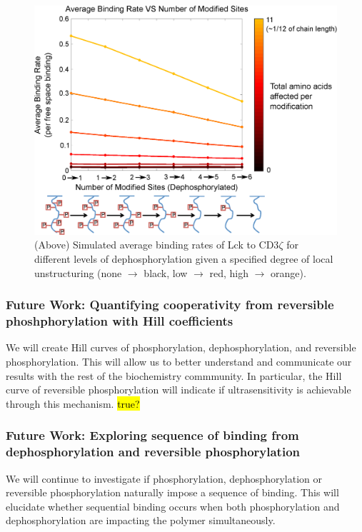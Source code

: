 \documentclass[../../AdvancementSummary.tex]{subfiles}
\begin{document}
\begin{figure}[H]
	\begin{center}
		\includegraphics[width=0.8\linewidth]{ResultsFigures/CD3ZetaStiffeningMembraneOn/Dephosphorylation/AvgBindVSTotalModified5.eps}
		\caption{(Above) Simulated average binding rates of Lck to CD3$\zeta$ for different levels of dephosphorylation given a specified degree of local unstructuring (none $\rightarrow$ black, low $\rightarrow$ red, high $\rightarrow$ orange).\label{fig: DephosMemOnCoop}}
	\end{center}
\end{figure}




\subsubsection{Future Work: Quantifying cooperativity from reversible phoshphorylation with Hill coefficients}

We will create Hill curves of phosphorylation, dephosphorylation, and reversible phosphorylation.  This will allow us to better understand and communicate our results with the rest of the biochemistry commmunity. In particular, the Hill curve of reversible phosphorylation will indicate if ultrasensitivity is achievable through this mechanism. \hl{true?}

\subsubsection{Future Work: Exploring sequence of binding from dephosphorylation and reversible phosphorylation}

We will continue to investigate if phosphorylation, dephosphorylation or reversible phosphorylation naturally impose a sequence of binding. This will elucidate whether sequential binding occurs when both phosphorylation and dephosphorylation are impacting the polymer simultaneously. 
\end{document}
